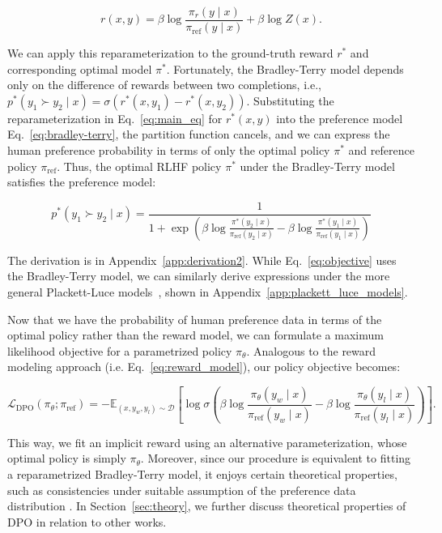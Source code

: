 \begin{equation}\label{eq:main_eq}
    r(x,y) =\beta \log \frac{\pi_r(y\mid x)}{\pi_\text{ref}(y\mid x)} + \beta \log Z(x).
\end{equation}

We can apply this reparameterization to the ground-truth reward $r^*$ and corresponding optimal model $\pi^*$. Fortunately, the Bradley-Terry model depends only on the difference of rewards between two completions, i.e., ${p^*(y_1 \succ y_2 \mid x) = \sigma(r^*(x, y_1) - r^*(x, y_2))}$. Substituting the reparameterization in Eq.~\ref{eq:main_eq} for $r^*(x,y)$ into the preference model Eq.~\ref{eq:bradley-terry}, the partition function cancels, and we can express the human preference probability in terms of only the optimal policy $\pi^*$ and reference policy $\pi_\text{ref}$. Thus, the optimal RLHF policy $\pi^*$ under the Bradley-Terry model satisfies the preference model:

\begin{equation}\label{eq:objective}
    p^*(y_1\succ y_2 \mid x)=\frac{1}{1 + \exp\left(\beta \log \frac{\pi^*(y_2\mid x)}{\pi_\text{ref}(y_2\mid x)} - \beta \log \frac{\pi^*(y_1\mid x)}{\pi_\text{ref}(y_1\mid x)}\right)}
\end{equation}

The derivation is in Appendix~\ref{app:derivation2}. While Eq.~\ref{eq:objective} uses the Bradley-Terry model, we can similarly derive expressions under the more general Plackett-Luce models~\citep{plackett1975analysis, luce2012individual}, shown in Appendix~\ref{app:plackett_luce_models}.

Now that we have the probability of human preference data in terms of the optimal policy rather than the reward model, we can formulate a maximum likelihood objective for a parametrized policy $\pi_\theta$. Analogous to the reward modeling approach (i.e. Eq.~\ref{eq:reward_model}), our policy objective becomes:

\begin{equation}\label{eq:optimum_model}
    \mathcal{L}_\text{DPO}(\pi_{\theta}; \pi_\text{ref}) = -\mathbb{E}_{(x, y_w, y_l)\sim \mathcal{D}}\left[\log \sigma \left(\beta \log \frac{\pi_{\theta}(y_w\mid x)}{\pi_\text{ref}(y_w\mid x)} - \beta \log \frac{\pi_{\theta}(y_l\mid x)}{\pi_\text{ref}(y_l\mid x)}\right)\right].
\end{equation}

{This way, we fit an implicit reward using an alternative parameterization, whose optimal policy is simply $\pi_\theta$.} Moreover, since our procedure is equivalent to fitting a reparametrized Bradley-Terry model, it enjoys certain theoretical properties, such as consistencies under suitable assumption of the preference data distribution \cite{bong2022generalized}. In Section~\ref{sec:theory}, we further discuss theoretical properties of DPO in relation to other works.

